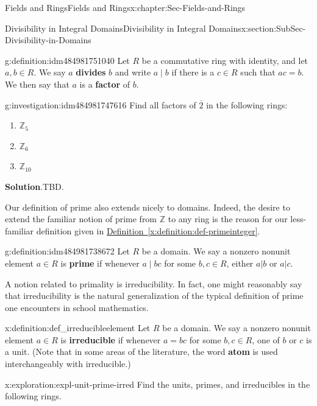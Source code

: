 \documentclass[oneside,10pt,]{book}
\newcommand{\blocktitlefont}{\relax}
\newcommand{\xreffont}{\relax}
\newcommand{\terminology}[1]{\textbf{#1}}
\numberwithin{equation}{section}
\def\Z{{\mathbb Z}}
\begin{document}
\begin{chapterptx}{Fields and Rings}{}{Fields and Rings}{}{}{x:chapter:Sec-Fields-and-Rings}
\begin{sectionptx}{Divisibility in Integral Domains}{}{Divisibility in Integral Domains}{}{}{x:section:SubSec-Divisibility-in-Domains}
\begin{definition}{}{g:definition:idm484981751040}%
%
%
Let \(R\) be a commutative ring with identity, and let \(a,b\in R\). We say \(a\) \terminology{divides} \(b\) and write \(a\mid b\) if there is a \(c\in R\) such that \(ac = b\). We then say that \(a\) is a \terminology{factor} of \(b\).%
\end{definition}
\begin{investigation}{}{g:investigation:idm484981747616}%
Find all factors of \(\overline{2}\) in the following rings:%
%
\begin{enumerate}
\item{}\(\displaystyle \Z_5\)%
\item{}\(\displaystyle \Z_6\)%
\item{}\(\displaystyle \Z_{10}\)%
\end{enumerate}
\par\smallskip%
\noindent\textbf{\blocktitlefont Solution}.\hypertarget{g:solution:idm484981740224}{}\quad{}TBD.%
\end{investigation}
Our definition of prime also extends nicely to domains. Indeed, the desire to extend the familiar notion of prime from \(\Z\) to any ring is the reason for our less-familiar definition given in \hyperref[x:definition:def-primeinteger]{Definition~{\xreffont\ref{x:definition:def-primeinteger}}}.%
\begin{definition}{}{g:definition:idm484981738672}%
Let \(R\) be a domain. We say a nonzero nonunit element \(a\in R\) is \terminology{prime} if whenever \(a\mid bc\) for some \(b,c\in R\), either \(a|b\) or \(a|c\).%
\end{definition}
A notion related to primality is irreducibility. In fact, one might reasonably say that irreducibility is the natural generalization of the typical definition of prime one encounters in school mathematics.%
\begin{definition}{}{x:definition:def_irreducibleelement}%
%
%
Let \(R\) be a domain. We say a nonzero nonunit element \(a\in R\) is \terminology{irreducible} if whenever \(a = bc\) for some \(b,c\in R\), one of \(b\) or \(c\) is a unit. (Note that in some areas of the literature, the word \terminology{atom} is used interchangeably with irreducible.)%
\end{definition}
\begin{exploration}{}{x:exploration:expl-unit-prime-irred}%
Find the units, primes, and irreducibles in the following rings.%

\end{exploration}
\end{sectionptx}
\end{chapterptx}
\end{document}
